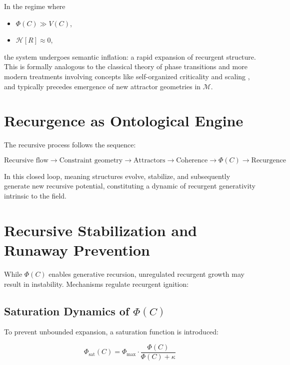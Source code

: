 In the regime where

\begin{itemize}
    \item \(\Phi(C) \gg V(C)\),
    \item \(\mathcal{H}[R] \approx 0\),
\end{itemize}

the system undergoes semantic inflation: a rapid expansion of recurgent structure. This is formally analogous to the classical theory of phase transitions \autocite{Landau1937} and more modern treatments involving concepts like self-organized criticality and scaling \autocite{BakTangWiesenfeld1987, Cardy1996, Goldenfeld1992}, and typically precedes emergence of new attractor geometries in \(\mathcal{M}\).

\section{Recurgence as Ontological Engine}

The recursive process follows the sequence:

\begin{equation}
\text{Recursive flow} \rightarrow \text{Constraint geometry} \rightarrow \text{Attractors} \rightarrow \text{Coherence} \rightarrow \Phi(C) \rightarrow \text{Recurgence}
\end{equation}

In this closed loop, meaning structures evolve, stabilize, and subsequently generate new recursive potential, constituting a dynamic of recurgent generativity intrinsic to the field.

\section{Recursive Stabilization and Runaway Prevention}

While \(\Phi(C)\) enables generative recursion, unregulated recurgent growth may result in instability. Mechanisms regulate recurgent ignition:

\subsection[Saturation Dynamics of Phi(C)]{Saturation Dynamics of \(\Phi(C)\)}

To prevent unbounded expansion, a saturation function is introduced:

\begin{equation}
\Phi_{\text{sat}}(C) = \Phi_{\text{max}} \cdot \frac{\Phi(C)}{\Phi(C) + \kappa}
\end{equation}


